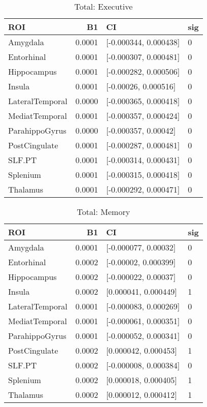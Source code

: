 \documentclass{article}
\begin{document}
\begin{table}[H]
\centering
\caption{Total: Executive} 
\begin{tabular}{lrll}
  \toprule
ROI & B1 & CI & sig \\ 
  \midrule
Amygdala & 0.0001 & [-0.000344, 0.000438] & 0 \\ 
  Entorhinal & 0.0001 & [-0.000307, 0.000481] & 0 \\ 
  Hippocampus & 0.0001 & [-0.000282, 0.000506] & 0 \\ 
  Insula & 0.0001 & [-0.00026, 0.000516] & 0 \\ 
  LateralTemporal & 0.0000 & [-0.000365, 0.000418] & 0 \\ 
  MediatTemporal & 0.0001 & [-0.000357, 0.000424] & 0 \\ 
  ParahippoGyrus & 0.0000 & [-0.000357, 0.00042] & 0 \\ 
  PostCingulate & 0.0001 & [-0.000287, 0.000481] & 0 \\ 
  SLF.PT & 0.0001 & [-0.000314, 0.000431] & 0 \\ 
  Splenium & 0.0001 & [-0.000315, 0.000418] & 0 \\ 
  Thalamus & 0.0001 & [-0.000292, 0.000471] & 0 \\ 
   \bottomrule
\end{tabular}
\end{table}%
\begin{table}[H]
\centering
\caption{Total: Memory} 
\begin{tabular}{lrll}
  \toprule
ROI & B1 & CI & sig \\ 
  \midrule
Amygdala & 0.0001 & [-0.000077, 0.00032] & 0 \\ 
  Entorhinal & 0.0002 & [-0.00002, 0.000399] & 0 \\ 
  Hippocampus & 0.0002 & [-0.000022, 0.00037] & 0 \\ 
   \rowcolor{orange!30}Insula & 0.0002 & [0.000041, 0.000449] & 1 \\ 
  LateralTemporal & 0.0001 & [-0.000083, 0.000269] & 0 \\ 
  MediatTemporal & 0.0001 & [-0.000061, 0.000351] & 0 \\ 
  ParahippoGyrus & 0.0001 & [-0.000052, 0.000341] & 0 \\ 
   \rowcolor{orange!30}PostCingulate & 0.0002 & [0.000042, 0.000453] & 1 \\ 
  SLF.PT & 0.0002 & [-0.000008, 0.000384] & 0 \\ 
   \rowcolor{orange!30}Splenium & 0.0002 & [0.000018, 0.000405] & 1 \\ 
   \rowcolor{orange!30}Thalamus & 0.0002 & [0.000012, 0.000412] & 1 \\ 
   \bottomrule
\end{tabular}
\end{table}
\end{document}
